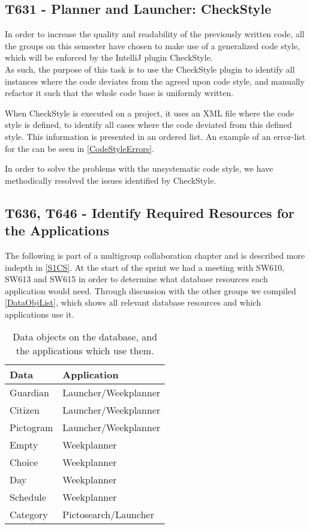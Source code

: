 \subsection{T631 - Planner and Launcher: CheckStyle}
In order to increase the quality and readability of the previously written code,
all the groups on this semester have chosen to make use of a generalized code
style, which will be enforced by the IntelliJ plugin CheckStyle.\\
As such, the purpose of this task is to use the CheckStyle plugin to identify
all instances where the code deviates from the agreed upon code style, and
manually refactor it such that the whole code base is uniformly written.\nl

When CheckStyle is executed on a project, it uses an XML file where the code
style is defined, to identify all cases where the code deviated from this
defined style. This information is presented in an ordered list. An example of
an error-list for the  can be seen in
\autoref{CodeStyleErrors}.


In order to solve the problems with the unsystematic code style, we have
methodically resolved the issues identified by CheckStyle.
		
\subsection{T636, T646 - Identify Required Resources for the
Applications}\label{ReqResources} The following is part of a multigroup
collaboration chapter and is described more indepth in \autoref{S1CS}. At the start of
the sprint we had a meeting with SW610, SW613 and SW615 in order to determine
what database resources each application would need. Through discussion with
the other groups we compiled \autoref{DataObjList}, which shows all relevant
database resources and which applications use it.

\begin{table}[H]
\centering
\begin{tabular}{|l|l|} 
\hline
\textbf{Data}	& \textbf{Application}	\\\hline
Guardian		& Launcher/Weekplanner 	\\\hline
Citizen    	   	& Launcher/Weekplanner 	\\\hline 
Pictogram 		& Launcher/Weekplanner 	\\\hline 
Empty    	   	& Weekplanner 			\\\hline
Choice   	   	& Weekplanner  			\\\hline
Day   	   		& Weekplanner 			\\\hline
Schedule  	   	& Weekplanner			\\\hline
Category       	& Pictosearch/Launcher	\\\hline
\end{tabular}
\caption{Data objects on the database, and the applications which use them.} 
\label{DataObjList}    
\end{table}

